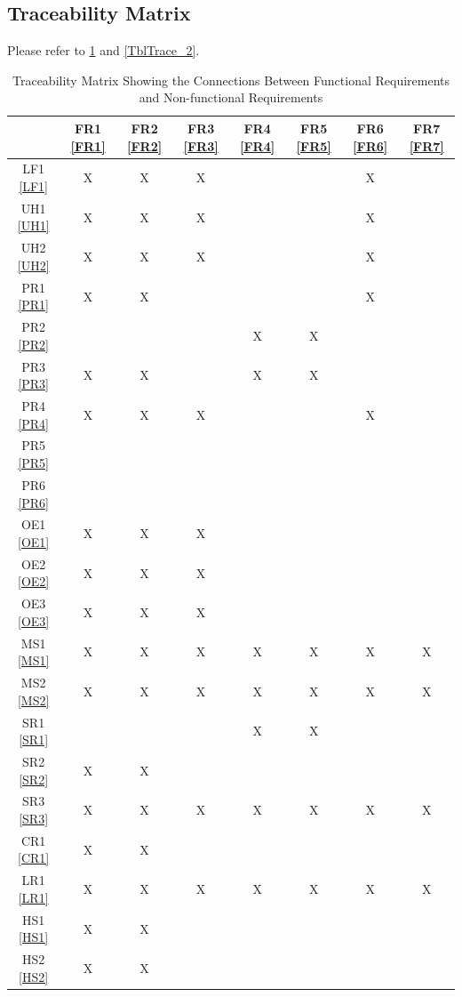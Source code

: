 \documentclass[12pt]{article}
\begin{document}
\subsection{Traceability Matrix}
Please refer to \ref{TblTrace_1} and \ref{TblTrace_2}.
\begin{table}[h!]
    \centering
    \begin{tabular}{|c|c|c|c|c|c|c|c|}
    \hline
        & FR1 \ref{FR1} & FR2 \ref{FR2}& FR3 \ref{FR3}& FR4 \ref{FR4}& FR5 \ref{FR5}& FR6 \ref{FR6}& FR7 \ref{FR7}\\
    \hline
    LF1 \ref{LF1}& X & X & X & & & X &   \\ \hline
    UH1 \ref{UH1}& X & X & X & & & X &   \\ \hline
    UH2 \ref{UH2}& X & X & X & & & X &   \\ \hline
    PR1 \ref{PR1}& X & X & & & & X &   \\ \hline
    PR2 \ref{PR2}& & & & X & X & &   \\ \hline
    PR3 \ref{PR3}& X & X & & X & X & &   \\ \hline
    PR4 \ref{PR4}& X & X & X & & & X &   \\ \hline
    PR5 \ref{PR5}& & & & & & &   \\ \hline
    PR6 \ref{PR6}& & & & & & &   \\ \hline
    OE1 \ref{OE1}& X & X & X & & & &   \\ \hline
    OE2 \ref{OE2}& X & X & X & & & &   \\ \hline
    OE3 \ref{OE3}& X & X & X & & & &   \\ \hline
    MS1 \ref{MS1}& X & X & X & X & X & X & X   \\ \hline
    MS2 \ref{MS2}& X & X & X & X & X & X & X   \\ \hline
    SR1 \ref{SR1}& & & & X & X & &   \\ \hline
    SR2 \ref{SR2}& X & X & & & & &   \\ \hline
    SR3 \ref{SR3}& X & X & X & X & X & X & X \\ \hline
    CR1 \ref{CR1}& X & X & & & & &   \\ \hline
    LR1 \ref{LR1}& X & X & X & X & X & X & X \\ \hline
    HS1 \ref{HS1}& X & X & & & & &   \\ \hline
    HS2 \ref{HS2}& X & X & & & & &   \\ \hline
    \end{tabular}
    \caption{Traceability Matrix Showing the Connections Between Functional Requirements and Non-functional Requirements} \label{TblTrace_1}
\end{table}
\end{document}
